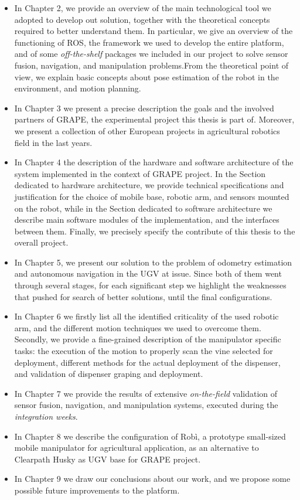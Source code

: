 \begin{itemize}
	\item In Chapter 2, we provide an overview of the main technological tool we adopted to develop out solution, together with the theoretical concepts required to better understand them. In particular, we give an overview of the functioning of \ac{ROS}, the framework we used to develop the entire platform, and of some \textit{off-the-shelf} packages we included in our project to solve sensor fusion, navigation, and manipulation problems.From the theoretical point of view, we explain basic concepts about pose estimation of the robot in the environment, and motion planning.
	\item In Chapter 3 we present a precise description the goals and the involved partners of \ac{GRAPE}, the experimental project this thesis is part of. Moreover, we present a collection of other European projects in agricultural robotics field in the last years.
	\item In Chapter 4 the description of the hardware and software architecture of the system implemented in the context of \ac{GRAPE} project. In the Section dedicated to hardware architecture, we provide technical specifications and justification for the choice of mobile base, robotic arm, and sensors mounted on the robot, while in the Section dedicated to software architecture we describe main software modules of the implementation, and the interfaces between them. Finally, we precisely specify the contribute of this thesis to the overall project.
	\item In Chapter 5, we present our solution to the problem of odometry estimation and autonomous navigation in the \ac{UGV} at issue. Since both of them went through several stages, for each significant step we highlight the weaknesses that pushed for search of better solutions, until the final configurations.
	\item In Chapter 6 we firstly list all the identified criticality of the used robotic arm, and the different motion techniques we used to overcome them. Secondly, we provide a fine-grained description of the manipulator specific tasks: the execution of the motion to properly scan the vine selected for deployment, different methods for the actual deployment of the dispenser, and validation of dispenser graping and deployment.
	\item In Chapter 7 we provide the results of extensive \textit{on-the-field} validation of sensor fusion, navigation, and manipulation systems, executed during the \textit{integration weeks}.
	\item In Chapter 8 we describe the configuration of Robì, a prototype small-sized mobile manipulator for agricultural application, as an alternative to Clearpath Husky as \ac{UGV} base for \ac{GRAPE} project.
	\item In Chapter 9 we draw our conclusions about our work, and we propose some possible future improvements to the platform.

\end{itemize}











